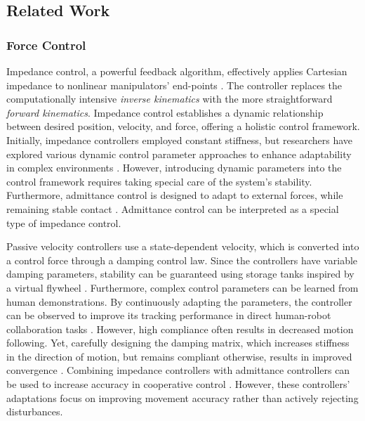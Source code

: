 \subsection{Related Work}

\subsubsection{Force Control}
Impedance control, a powerful feedback algorithm, effectively applies Cartesian impedance to nonlinear manipulators' end-points \parencite{takegaki1981new, hogan1985impedance}. The controller replaces the computationally intensive \textit{inverse kinematics} with the more straightforward \textit{forward kinematics}. Impedance control establishes a dynamic relationship between desired position, velocity, and force, offering a holistic control framework.
Initially, impedance controllers employed constant stiffness, but researchers have explored various dynamic control parameter approaches to enhance adaptability in complex environments \parencite{vanderborght2013variable, abu2020variable}. However, introducing dynamic parameters into the control framework requires taking special care of the system's stability.
Furthermore, admittance control is designed to adapt to external forces, while remaining stable contact \parencite{glosser1994implementation}. Admittance control can be interpreted as a special type of impedance control.

Passive velocity controllers use a state-dependent velocity, which is converted into a control force through a damping control law. Since the controllers have variable damping parameters, stability can be guaranteed using storage tanks inspired by a virtual flywheel \parencite{li1999passive}. 
Furthermore, complex control parameters can be learned from human demonstrations. By continuously adapting the parameters, the controller can be observed to improve its tracking performance in direct human-robot collaboration tasks \parencite{gribovskaya2011motion}.
However, high compliance often results in decreased motion following. Yet, carefully designing the damping matrix, which increases stiffness in the direction of motion, but remains compliant otherwise, results in improved convergence \parencite{kronander2015passive}. 
Combining impedance controllers with admittance controllers can be used to increase accuracy in cooperative control
\parencite{fujiki2022series}.
However, these controllers' adaptations focus on improving movement accuracy rather than actively rejecting disturbances.

